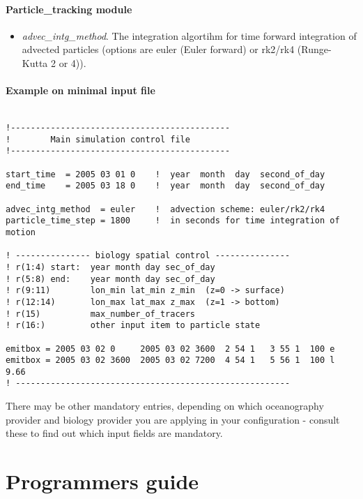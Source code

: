 \subsection{Particle\_tracking module}
\begin{itemize}
  \item {\em advec\_intg\_method}. The integration algortihm for time forward integration
        of advected particles (options are euler (Euler forward) or rk2/rk4 (Runge-Kutta 2 or 4)).
\end{itemize}

\subsection{Example on minimal input file}
{\small 
\begin{verbatim}

!--------------------------------------------
!        Main simulation control file 
!--------------------------------------------

start_time  = 2005 03 01 0    !  year  month  day  second_of_day
end_time    = 2005 03 18 0    !  year  month  day  second_of_day

advec_intg_method  = euler    !  advection scheme: euler/rk2/rk4
particle_time_step = 1800     !  in seconds for time integration of motion

! --------------- biology spatial control ---------------
! r(1:4) start:  year month day sec_of_day
! r(5:8) end:    year month day sec_of_day
! r(9:11)        lon_min lat_min z_min  (z=0 -> surface)
! r(12:14)       lon_max lat_max z_max  (z=1 -> bottom)
! r(15)          max_number_of_tracers
! r(16:)         other input item to particle state

emitbox = 2005 03 02 0     2005 03 02 3600  2 54 1   3 55 1  100 e 
emitbox = 2005 03 02 3600  2005 03 02 7200  4 54 1   5 56 1  100 l 9.66
! -------------------------------------------------------
\end{verbatim}
}

There may be other mandatory entries, depending on which 
oceanography provider and biology provider you are applying in your 
configuration - consult these to find out which input fields are mandatory.


\part{Programmers guide}


